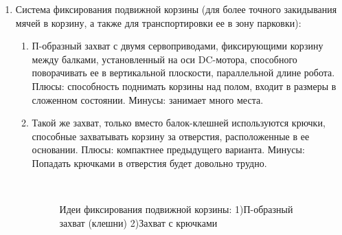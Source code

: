 \begin{enumerate}
\begin{enumerate}
\begin{enumerate}
\begin{enumerate}
	    \end{enumerate}
	    
	    \item Система фиксирования подвижной корзины (для более точного закидывания мячей в корзину, а также для транспортировки ее в зону парковки):\newline
	    \begin{enumerate}
	      \item П-образный захват с двумя сервоприводами, фиксирующими корзину между балками, установленный на оси DC-мотора, способного поворачивать ее в вертикальной плоскости, параллельной длине робота. Плюсы: способность поднимать корзины над полом, входит в размеры в сложенном состоянии. Минусы: занимает много места.\newline
	      
          \item Такой же захват, только вместо балок-клешней используются крючки, способные захватывать корзину за отверстия, расположенные в ее основании. Плюсы: компактнее предыдущего варианта. Минусы: Попадать крючками в отверстия будет довольно трудно.\newline
          
          \begin{figure}[H]
          	\begin{minipage}[h]{0.2\linewidth}
          		\center  
          	\end{minipage}
          	\begin{minipage}[h]{0.6\linewidth}
          		\caption{Идеи фиксирования подвижной корзины: 1)П-образный захват (клешни) 2)Захват с крючками}
          	\end{minipage}
          \end{figure}
          

\end{enumerate}
\end{enumerate}
\end{enumerate}
\end{enumerate}
